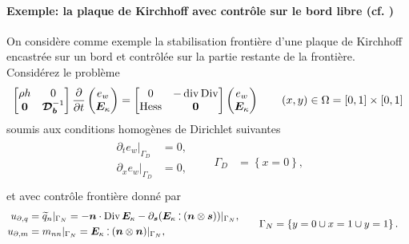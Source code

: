 \paragraph{Exemple: la plaque de Kirchhoff avec contrôle sur le bord libre (cf. )}
On considère comme exemple la stabilisation frontière d'une plaque de Kirchhoff encastrée sur un bord et contrôlée sur la partie restante de la frontière.  Considérez le problème 
\begin{equation*}
\begin{bmatrix}
\rho h & 0 \\ 
\bm{0} & \bm{\mathcal{D}_b}^{-1} \\
\end{bmatrix}
\diffp{}{t}
\begin{pmatrix}
e_w \\ \bm{E}_\kappa \\
\end{pmatrix} = 
\begin{bmatrix}
0 & -\div\Div \\ 
\Hess & \bm{0} \\
\end{bmatrix}
\begin{pmatrix}
e_w \\ \bm{E}_\kappa \\
\end{pmatrix} \qquad (x, y) \in \Omega = [0, 1]\times[0,1]
\end{equation*}
soumis aux conditions homogènes de Dirichlet suivantes
\begin{align*}
\begin{aligned}
\partial_t e_w|_{\Gamma_D} &= 0, \\
\partial_x e_w|_{\Gamma_D} &= 0, \\
\end{aligned} \qquad {\Gamma_D} &= \left\{x = 0 \right\},
\end{align*}
et avec contrôle frontière donné par
\begin{align*}
\begin{aligned}
u_{\partial, q} & = \widetilde{q}_n|_{\Gamma_N} = -\bm{n} \cdot \Div \bm{E}_\kappa - \partial_{\bm{s}} (\bm{E}_\kappa \cddot (\bm{n} \otimes \bm{s}))|_{\Gamma_N},\\
u_{\partial, m} &= m_{nn}|_{\Gamma_N} =\bm{E}_\kappa \cddot (\bm{n}\otimes \bm{n})|_{\Gamma_N}, \; \\
\end{aligned} \qquad {\Gamma_N} &= \left\{y = 0 \cup x=1 \cup y=1 \right\}.
\end{align*}

